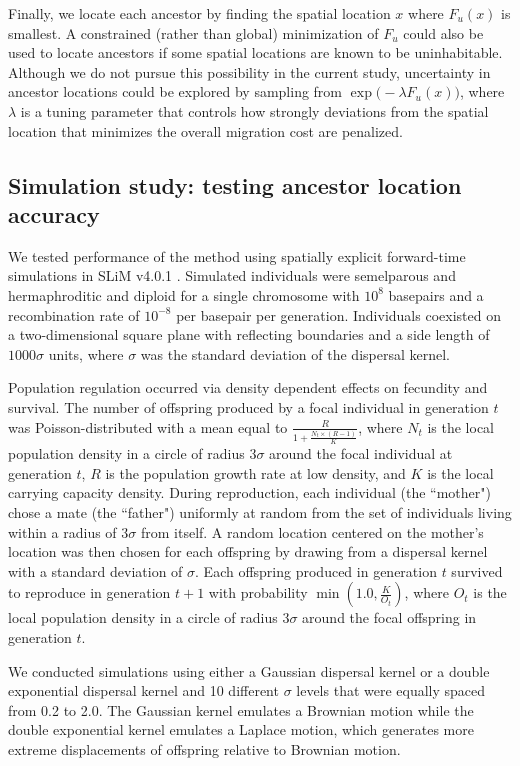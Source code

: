 Finally, we locate each ancestor by finding the spatial location $x$ where
$F_u(x)$ is smallest. A constrained (rather than global) minimization of $F_u$
could also be used to locate ancestors if some spatial locations are known to
be uninhabitable. Although we do not pursue this possibility in the current
study, uncertainty in ancestor locations could be explored by sampling from
$\exp\bigl(-\lambda F_u(x)\bigr)$, where $\lambda$ is a tuning parameter that
controls how strongly deviations from the spatial location that minimizes the
overall migration cost are penalized.

\subsection{Simulation study: testing ancestor location accuracy}

We tested performance of the method using spatially explicit forward-time 
simulations in SLiM v4.0.1 \citep{Haller_Messer_2023}. Simulated individuals
were semelparous and hermaphroditic and diploid for a single chromosome with 
$10^8$ basepairs and a recombination rate of $10^{-8}$ per basepair per
generation. Individuals coexisted on a two-dimensional square plane with
reflecting boundaries and a side length of $1000\sigma$ units, where $\sigma$ 
was the standard deviation of the dispersal kernel.

Population regulation occurred via density dependent effects on fecundity and
survival. The number of offspring produced by a focal individual in generation
$t$ was Poisson-distributed with a mean equal to 
$\frac{R}{1 + \frac{N_t \times (R-1)}{K}}$,
where $N_t$ is the local population density in a circle of radius $3\sigma$ 
around the focal individual at generation $t$, $R$ is the population growth 
rate at low density, and $K$ is the local carrying capacity density. During 
reproduction, each individual (the ``mother") chose a mate (the ``father") 
uniformly at random from the set of individuals living within a radius of 
$3\sigma$ from itself. A random location centered on the mother's location was 
then chosen for each offspring by drawing from a dispersal kernel with a 
standard deviation of $\sigma$. Each offspring produced in generation $t$ 
survived to reproduce in generation $t+1$ with probability 
$\min(1.0, \frac{K}{O_t})$, where $O_t$ is the local population density in a 
circle of radius $3\sigma$ around the focal offspring in generation $t$.

We conducted simulations using either a Gaussian dispersal kernel or a double
exponential dispersal kernel and 10 different $\sigma$ levels that were equally
spaced from 0.2 to 2.0. The Gaussian kernel emulates a Brownian motion while
the double exponential kernel emulates a Laplace motion, which generates more
extreme displacements of offspring relative to Brownian motion.

